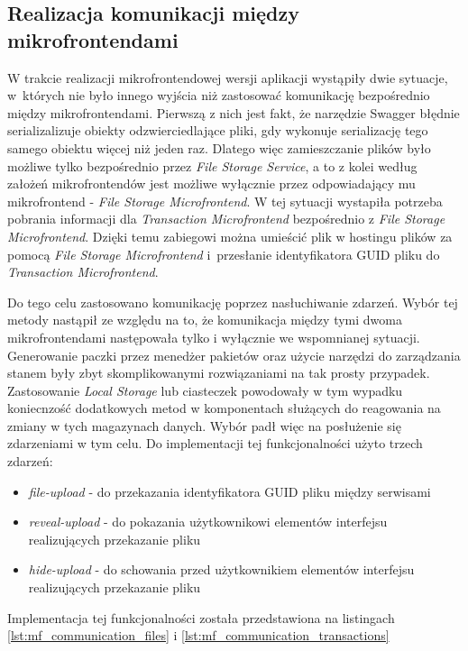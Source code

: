 \documentclass{SGGW-thesis}
\begin{document}
  \subsection{Realizacja komunikacji między mikrofrontendami}
  W trakcie realizacji mikrofrontendowej wersji aplikacji wystąpiły dwie sytuacje, w~których nie było innego wyjścia niż zastosować komunikację bezpośrednio między mikrofrontendami.
  Pierwszą z nich jest fakt, że narzędzie Swagger błędnie serializalizuje obiekty odzwierciedlające pliki, gdy wykonuje serializację tego samego obiektu więcej niż jeden raz. Dlatego więc zamieszczanie plików było możliwe tylko bezpośrednio przez \textit{File Storage Service}, a to z kolei według założeń mikrofrontendów jest możliwe wyłącznie przez odpowiadający mu mikrofrontend - \textit{File Storage Microfrontend}. W tej sytuacji wystapiła potrzeba pobrania informacji dla \textit{Transaction Microfrontend} bezpośrednio z \textit{File Storage Microfrontend}. Dzięki temu zabiegowi można umieścić plik w hostingu plików za pomocą \textit{File Storage Microfrontend} i~przesłanie identyfikatora GUID pliku do \textit{Transaction Microfrontend}.

  Do tego celu zastosowano komunikację poprzez nasłuchiwanie zdarzeń. Wybór tej metody nastąpił ze względu na to, że komunikacja między tymi dwoma mikrofrontendami następowała tylko i wyłącznie we wspomnianej sytuacji. Generowanie paczki przez menedżer pakietów oraz użycie narzędzi do zarządzania stanem były zbyt skomplikowanymi rozwiązaniami na tak prosty przypadek. Zastosowanie \textit{Local Storage} lub ciasteczek powodowały w tym wypadku koniecnzość dodatkowych metod w komponentach służących do reagowania na zmiany w tych magazynach danych. Wybór padł więc na posłużenie się zdarzeniami w tym celu. Do implementacji tej funkcjonalności użyto trzech zdarzeń:

  \begin{itemize}
    \item \textit{file-upload} - do przekazania identyfikatora GUID pliku między serwisami
    \item \textit{reveal-upload} - do pokazania użytkownikowi elementów interfejsu realizujących przekazanie pliku
    \item \textit{hide-upload} - do schowania przed użytkownikiem elementów interfejsu realizujących przekazanie pliku
  \end{itemize}

  Implementacja tej funkcjonalności została przedstawiona na listingach \cref{lst:mf_communication_files} i \cref{lst:mf_communication_transactions}
\end{document}
